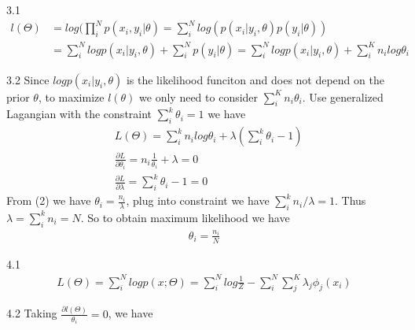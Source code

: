 \documentclass[12pt]{article}
\newenvironment{problem}[2][Problem]{\begin{trivlist}
\item[\hskip \labelsep {\bfseries #1}\hskip \labelsep {\bfseries #2}]}{\end{trivlist}}
\begin{document}
\begin{problem}{Problem 3}
\item{3.1}
\begin{align*}
	l(\Theta) &= log(\prod_i^N p(x_i, y_i|\theta)  = \sum_i^N log(p(x_i|y_i, \theta) p(y_i|\theta))\\
	&= \sum_i^N logp(x_i|y_i,\theta) + \sum_i^N p(y_i|\theta)
	 = \sum_i^N logp(x_i|y_i,\theta) + \sum_i^K n_i log\theta_i
\end{align*}
\item{3.2}
Since $logp(x_i|y_i,\theta)$ is the likelihood funciton and does not depend on the prior $\theta$, to maximize $l(\theta)$ we only need to consider $\sum_i^K n_i \theta_i$. Use generalized Lagangian with the constraint $\sum_i^k\theta_i = 1$ we have 
\begin{align}
	&L(\Theta) = \sum_i^kn_ilog\theta_i + \lambda (\sum_i^k\theta_i - 1) \\
	&\frac{\partial L}{\partial \theta_i} = n_i \frac{1}{\theta_i} + \lambda = 0\\
	&\frac{\partial L}{\partial \lambda} = \sum_i^k\theta_i - 1 = 0
\end{align}
From (2) we have $\theta_i = \frac{n_i}{\lambda}$, plug into constraint we have $\sum_i^k n_i/\lambda = 1$. Thus $\lambda = \sum_i^kn_i = N$. So to obtain maximum likelihood we have
\begin{align*}
	\theta_i = \frac{n_i}{N}
\end{align*}
\end{problem}

\begin{problem}{Problem 4}
\item{4.1}
\begin{align*}
	L(\Theta) = \sum_i^Nlogp(x;\Theta) = \sum_i^Nlog\frac{1}{Z} - \sum_i^N\sum_j^K\lambda_j\phi_j(x_i) 
\end{align*}
\item{4.2}
Taking $\frac{\partial l(\Theta)}{\theta_i} = 0$, we have
\end{problem}

 
\end{document}
